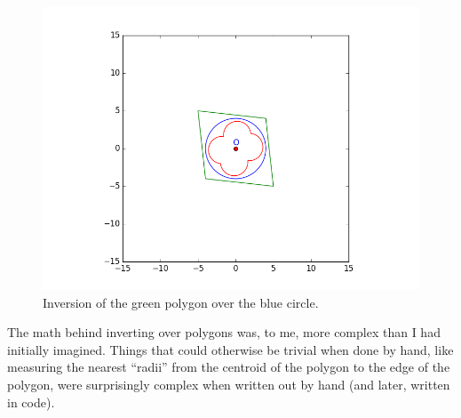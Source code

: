 \documentclass[a4paper,12pt]{article}
\numberwithin{figure}{section}
\begin{document}
        \begin{figure}[H]
            \centering
            \includegraphics[scale=0.6]{./pictures/INVERT_POLY_CIRCLE}
            \caption{Inversion of the green polygon over the blue circle.}
            \label{fig:invpcircle}
        \end{figure}
        
        The math behind inverting over polygons was, to me, more complex than I had initially imagined. Things that could otherwise be trivial when done by hand, like measuring the nearest ``radii'' from the centroid of the polygon to the edge of the polygon, were surprisingly complex when written out by hand (and later, written in code).
        
\end{document}
